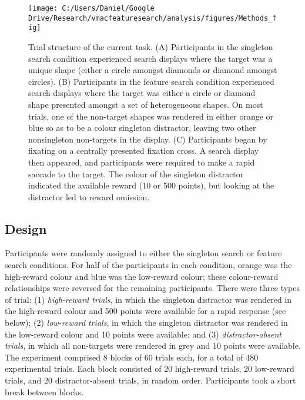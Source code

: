 \documentclass[man, a4paper, noextraspace, 11pt,floatsintext]{apa6}
\theoremstyle{definition}
\theoremstyle{definition}
\theoremstyle{definition}
\theoremstyle{remark}
\begin{document}
\begin{figure}[!h]

{\centering \texttt{[image: C:/Users/Daniel/Google Drive/Research/vmacfeaturesearch/analysis/figures/Methods\_fig]} 

}

\caption{Trial structure of the current task. (A) Participants in
the singleton search condition experienced search displays where the
target was a unique shape (either a circle amongst diamonds or diamond
amongst circles). (B) Participants in the feature search condition
experienced search displays where the target was either a circle or
diamond shape presented amongst a set of heterogeneous shapes. On most
trials, one of the non-target shapes was rendered in either orange or
blue so as to be a colour singleton distractor, leaving two other
nonsingleton non-targets in the display. (C) Participants began by
fixating on a centrally presented fixation cross. A search display then
appeared, and participants were required to make a rapid saccade to the
target. The colour of the singleton distractor indicated the available
reward (10 or 500 points), but looking at the distractor led to reward
omission.}\label{fig:methodFig}
\end{figure}

\subsection{Design}\label{design}

Participants were randomly assigned to either the singleton search or
feature search conditions. For half of the participants in each
condition, orange was the high-reward colour and blue was the low-reward
colour; these colour-reward relationships were reversed for the
remaining participants. There were three types of trial: (1)
\emph{high-reward trials}, in which the singleton distractor was
rendered in the high-reward colour and 500 points were available for a
rapid response (see below); (2) \emph{low-reward trials}, in which the
singleton distractor was rendered in the low-reward colour and 10 points
were available; and (3) \emph{distractor-absent trials}, in which all
non-targets were rendered in grey and 10 points were available. The
experiment comprised 8 blocks of 60 trials each, for a total of 480
experimental trials. Each block consisted of 20 high-reward trials, 20
low-reward trials, and 20 distractor-absent trials, in random order.
Participants took a short break between blocks.
\end{document}
